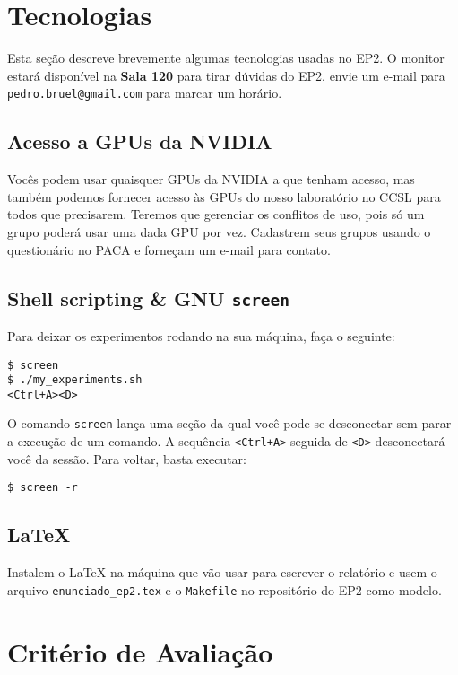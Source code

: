 \documentclass[final,12pt,a4paper]{elsarticle}
\begin{document}
\section{Tecnologias}

Esta seção descreve brevemente algumas tecnologias usadas no EP2.  O monitor
estará disponível na \textbf{Sala 120} para tirar dúvidas do EP2,
envie um e-mail para \texttt{pedro.bruel@gmail.com} para
marcar um horário.

\subsection{Acesso a GPUs da NVIDIA}

Vocês podem usar quaisquer GPUs da NVIDIA a que tenham acesso, mas também
podemos fornecer acesso às GPUs do nosso laboratório no CCSL para todos que
precisarem. Teremos que gerenciar os conflitos de uso, pois só um grupo poderá
usar uma dada GPU por vez. Cadastrem seus grupos usando o questionário no PACA
e forneçam um e-mail para contato.

\subsection{Shell scripting \& GNU \texttt{screen}}

Para deixar os experimentos rodando na sua máquina, faça o seguinte:

\begin{lstlisting}
$ screen
$ ./my_experiments.sh
<Ctrl+A><D>
\end{lstlisting}

O comando \texttt{screen} lança uma seção da qual você pode se desconectar sem
parar a execução de um comando. A sequência \texttt{<Ctrl+A>} seguida de
\texttt{<D>} desconectará você da sessão. Para voltar, basta executar:

\begin{lstlisting}
$ screen -r
\end{lstlisting}

\subsection{\LaTeX}

Instalem o \LaTeX{} na máquina que vão usar para escrever o relatório e usem o
arquivo \texttt{enunciado\_ep2.tex} e o \texttt{Makefile} no repositório do EP2
como modelo.

\section{Critério de Avaliação}
\end{document}
